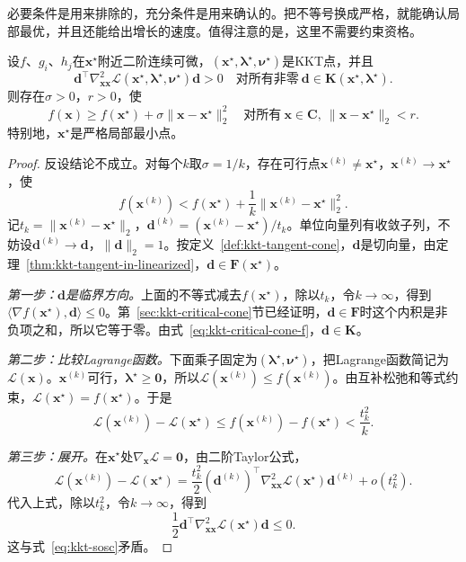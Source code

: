 必要条件是用来排除的，充分条件是用来确认的。把不等号换成严格，就能确认局部最优，并且还能给出增长的速度。值得注意的是，这里不需要约束资格。

\begin{theorem}[二阶充分条件]
\label{thm:kkt-sosc}
设$f$、$g_i$、$h_j$在$\bm{x}^\star$附近二阶连续可微，$(\bm{x}^\star,\bm{\lambda}^\star,\bm{\nu}^\star)$是KKT点，并且
\begin{equation}
 \bm{d}^\top\nabla^2_{\bm{x}\bm{x}}\mathcal{L}(\bm{x}^\star,\bm{\lambda}^\star,\bm{\nu}^\star)\bm{d}>0
 \quad\text{对所有非零}\ \bm{d}\in\bm{K}(\bm{x}^\star,\bm{\lambda}^\star).
 \label{eq:kkt-sosc}
\end{equation}
则存在$\sigma>0$，$r>0$，使
\begin{equation}
 f(\bm{x})\geq f(\bm{x}^\star)+\sigma\lVert\bm{x}-\bm{x}^\star\rVert_2^2
 \quad\text{对所有}\ \bm{x}\in\bm{C},\ \lVert\bm{x}-\bm{x}^\star\rVert_2<r.
 \label{eq:kkt-quadratic-growth}
\end{equation}
特别地，$\bm{x}^\star$是严格局部最小点。
\end{theorem}

\begin{proof}
反设结论不成立。对每个$k$取$\sigma=1/k$，存在可行点$\bm{x}^{(k)}\neq\bm{x}^\star$，$\bm{x}^{(k)}\to\bm{x}^\star$，使
\[
 f(\bm{x}^{(k)})<f(\bm{x}^\star)+\frac1k\lVert\bm{x}^{(k)}-\bm{x}^\star\rVert_2^2.
\]
记$t_k=\lVert\bm{x}^{(k)}-\bm{x}^\star\rVert_2$，$\bm{d}^{(k)}=(\bm{x}^{(k)}-\bm{x}^\star)/t_k$。单位向量列有收敛子列，不妨设$\bm{d}^{(k)}\to\bm{d}$，$\lVert\bm{d}\rVert_2=1$。按定义~\ref{def:kkt-tangent-cone}，$\bm{d}$是切向量，由定理~\ref{thm:kkt-tangent-in-linearized}，$\bm{d}\in\bm{F}(\bm{x}^\star)$。

\emph{第一步：$\bm{d}$是临界方向。}上面的不等式减去$f(\bm{x}^\star)$，除以$t_k$，令$k\to\infty$，得到$\langle\nabla f(\bm{x}^\star),\bm{d}\rangle\leq0$。第~\ref{sec:kkt-critical-cone}节已经证明，$\bm{d}\in\bm{F}$时这个内积是非负项之和，所以它等于零。由式~\eqref{eq:kkt-critical-cone-f}，$\bm{d}\in\bm{K}$。

\emph{第二步：比较Lagrange函数。}下面乘子固定为$(\bm{\lambda}^\star,\bm{\nu}^\star)$，把Lagrange函数简记为$\mathcal{L}(\bm{x})$。$\bm{x}^{(k)}$可行，$\bm{\lambda}^\star\geq\bm{0}$，所以$\mathcal{L}(\bm{x}^{(k)})\leq f(\bm{x}^{(k)})$。由互补松弛和等式约束，$\mathcal{L}(\bm{x}^\star)=f(\bm{x}^\star)$。于是
\[
 \mathcal{L}(\bm{x}^{(k)})-\mathcal{L}(\bm{x}^\star)\leq f(\bm{x}^{(k)})-f(\bm{x}^\star)<\frac{t_k^2}{k}.
\]

\emph{第三步：展开。}在$\bm{x}^\star$处$\nabla_{\bm{x}}\mathcal{L}=\bm{0}$，由二阶Taylor公式，
\[
 \mathcal{L}(\bm{x}^{(k)})-\mathcal{L}(\bm{x}^\star)=\frac{t_k^2}{2}(\bm{d}^{(k)})^\top\nabla^2_{\bm{x}\bm{x}}\mathcal{L}(\bm{x}^\star)\bm{d}^{(k)}+o(t_k^2).
\]
代入上式，除以$t_k^2$，令$k\to\infty$，得到
\[
 \frac12\bm{d}^\top\nabla^2_{\bm{x}\bm{x}}\mathcal{L}(\bm{x}^\star)\bm{d}\leq0.
\]
这与式~\eqref{eq:kkt-sosc}矛盾。
\end{proof}

